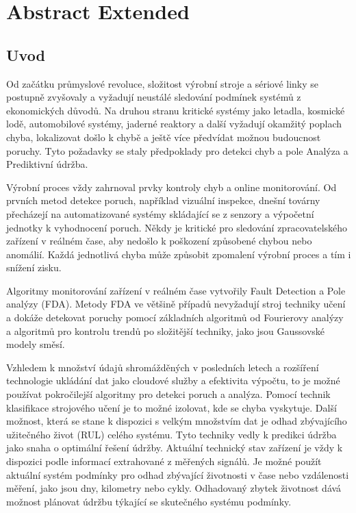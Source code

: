 \chapter{Abstract Extended}

\section{Uvod}

Od začátku průmyslové revoluce, složitost
výrobní stroje a sériové linky se postupně zvyšovaly a vyžadují
neustálé sledování podmínek systémů z ekonomických důvodů.
Na druhou stranu kritické systémy jako letadla, kosmické lodě,
automobilové systémy, jaderné reaktory a další vyžadují okamžitý poplach
chyba, lokalizovat došlo k chybě a ještě více předvídat možnou budoucnost
poruchy. Tyto požadavky se staly předpoklady pro detekci chyb
a pole Analýza a Prediktivní údržba.

Výrobní proces vždy zahrnoval prvky kontroly chyb a online
monitorování. Od prvních metod detekce poruch, například vizuální
inspekce, dnešní továrny přecházejí na automatizované systémy skládající se z
senzory a výpočetní jednotky k vyhodnocení poruch. Někdy je
kritické pro sledování zpracovatelského zařízení v reálném čase, aby nedošlo k poškození
způsobené chybou nebo anomálií. Každá jednotlivá chyba může způsobit zpomalení
výrobní proces a tím i snížení zisku.

Algoritmy monitorování zařízení v reálném čase vytvořily Fault Detection a
Pole analýzy (FDA). Metody FDA ve většině případů nevyžadují stroj
techniky učení a dokáže detekovat poruchy pomocí základních algoritmů
od Fourierovy analýzy a algoritmů pro kontrolu trendů po složitější
techniky, jako jsou Gaussovské modely směsí.

Vzhledem k množství údajů shromážděných v posledních letech a rozšíření
technologie ukládání dat jako cloudové služby a efektivita výpočtu, to
je možné používat pokročilejší algoritmy pro detekci poruch a
analýza. Pomocí technik klasifikace strojového učení je to možné
izolovat, kde se chyba vyskytuje. Další možnost, která se stane
k dispozici s velkým množstvím dat je odhad zbývajícího užitečného
život (RUL) celého systému. Tyto techniky vedly k predikci
údržba jako snaha o optimální řešení údržby. Aktuální
technický stav zařízení je vždy k dispozici podle informací
extrahované z měřených signálů. Je možné použít aktuální systém
podmínky pro odhad zbývající životnosti v čase nebo vzdálenosti
měření, jako jsou dny, kilometry nebo cykly. Odhadovaný zbytek
životnost dává možnost plánovat údržbu týkající se skutečného systému
podmínky.

